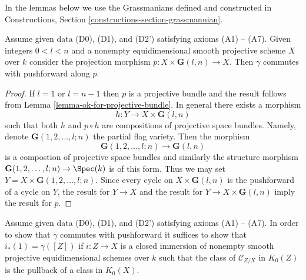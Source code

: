 \noindent
In the lemmas below we use the Grassmanians defined and constructed
in Constructions, Section \ref{constructions-section-grassmannian}.

\begin{lemma}
\label{lemma-grassmanian}
Assume given data (D0), (D1), and (D2') satisfying axioms (A1) -- (A7).
Given integers $0 < l < n$ and a nonempty equidimensional
smooth projective scheme $X$ over $k$ consider the projection morphism
$p : X \times \mathbf{G}(l, n) \to X$.
Then $\gamma$ commutes with pushforward along $p$.
\end{lemma}

\begin{proof}
If $l = 1$ or $l = n - 1$ then $p$ is a projective bundle and
the result follows from Lemma \ref{lemma-ok-for-projective-bundle}.
In general there exists a morphism
$$
h : Y \to X \times \mathbf{G}(l, n)
$$
such that both $h$ and $p \circ h$ are compositions of projective
space bundles. Namely, denote $\mathbf{G}(1, 2, \ldots, l; n)$
the partial flag variety. Then the morphism
$$
\mathbf{G}(1, 2, \ldots, l; n) \to \mathbf{G}(l, n)
$$
is a compostion of projective space bundles and similarly the
structure morphism $\mathbf{G}(1, 2, \ldots, l; n) \to \Spec(k)$
is of this form. Thus we may set $Y = X \times \mathbf{G}(1, 2, \ldots, l; n)$.
Since every cycle on $X \times \mathbf{G}(l, n)$ is the pushforward of
a cycle on $Y$, the result for $Y \to X$ and the result for
$Y \to X \times \mathbf{G}(l, n)$ imply the result for $p$.
\end{proof}

\begin{lemma}
\label{lemma-enough-better}
Assume given data (D0), (D1), and (D2') satisfying axioms (A1) -- (A7).
In order to show that $\gamma$ commutes with pushforward it suffices
to show that $i_*(1) = \gamma([Z])$ if $i : Z \to X$ is a closed
immersion of nonempty smooth projective equidimensional schemes over $k$
such that the class of $\mathcal{C}_{Z/X}$ in $K_0(Z)$ is the
pullback of a class in $K_0(X)$.
\end{lemma}

